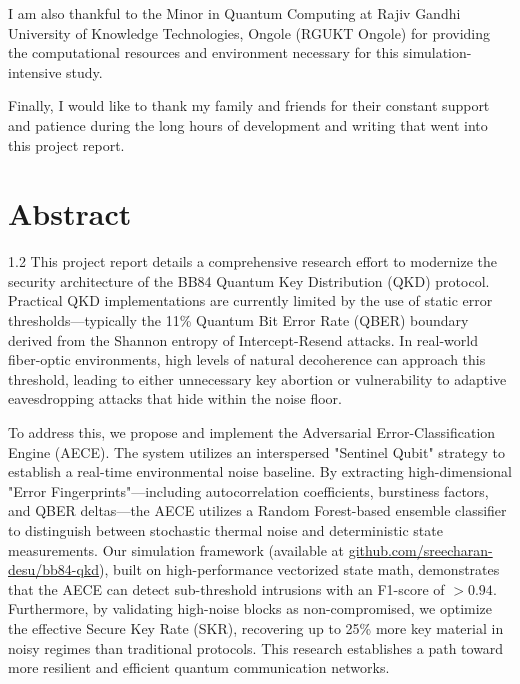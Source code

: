 \documentclass[journal,onecolumn,12pt,draftclsnofoot]{IEEEtran}
\begin{document}
I am also thankful to the Minor in Quantum Computing at Rajiv Gandhi University of Knowledge Technologies, Ongole (RGUKT Ongole) for providing the computational resources and environment necessary for this simulation-intensive study. 

Finally, I would like to thank my family and friends for their constant support and patience during the long hours of development and writing that went into this project report.

\newpage

\section*{Abstract}
\vspace{0.2in}

\begin{spacing}{1.2}
This project report details a comprehensive research effort to modernize the security architecture of the BB84 Quantum Key Distribution (QKD) protocol. Practical QKD implementations are currently limited by the use of static error thresholds—typically the 11\% Quantum Bit Error Rate (QBER) boundary derived from the Shannon entropy of Intercept-Resend attacks. In real-world fiber-optic environments, high levels of natural decoherence can approach this threshold, leading to either unnecessary key abortion or vulnerability to adaptive eavesdropping attacks that hide within the noise floor. 

To address this, we propose and implement the Adversarial Error-Classification Engine (AECE). The system utilizes an interspersed "Sentinel Qubit" strategy to establish a real-time environmental noise baseline. By extracting high-dimensional "Error Fingerprints"—including autocorrelation coefficients, burstiness factors, and QBER deltas—the AECE utilizes a Random Forest-based ensemble classifier to distinguish between stochastic thermal noise and deterministic state measurements. Our simulation framework (available at \href{https://github.com/sreecharan-desu/bb84-qkd}{github.com/sreecharan-desu/bb84-qkd}), built on high-performance vectorized state math, demonstrates that the AECE can detect sub-threshold intrusions with an F1-score of $>0.94$. Furthermore, by validating high-noise blocks as non-compromised, we optimize the effective Secure Key Rate (SKR), recovering up to 25\% more key material in noisy regimes than traditional protocols. This research establishes a path toward more resilient and efficient quantum communication networks.
\end{spacing}
\end{document}
